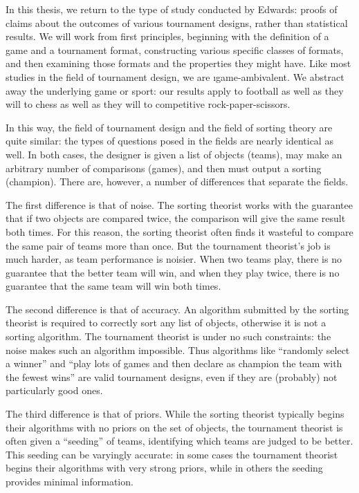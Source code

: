 {    In this thesis, we return to the type of study conducted by Edwards: proofs of claims about the outcomes of various tournament designs, rather than statistical results. We will work from first principles, beginning with the definition of a game and a tournament format, constructing various specific classes of formats, and then examining those formats and the properties they might have. Like most studies in the field of tournament design, we are \i{game-ambivalent}. We abstract away the underlying game or sport: our results apply to football as well as they will to chess as well as they will to competitive rock-paper-scissors.

    In this way, the field of tournament design and the field of sorting theory are quite similar: the types of questions posed in the fields are nearly identical as well. In both cases, the designer is given a list of objects (teams), may make an arbitrary number of comparisons (games), and then must output a sorting (champion). There are, however, a number of differences that separate the fields.

    The first difference is that of noise. The sorting theorist works with the guarantee that if two objects are compared twice, the comparison will give the same result both times. For this reason, the sorting theorist often finds it wasteful to compare the same pair of teams more than once. But the tournament theorist's job is much harder, as team performance is noisier. When two teams play, there is no guarantee that the better team will win, and when they play twice, there is no guarantee that the same team will win both times.

    The second difference is that of accuracy. An algorithm submitted by the sorting theorist is required to correctly sort any list of objects, otherwise it is not a sorting algorithm. The tournament theorist is under no such constraints: the noise makes such an algorithm impossible. Thus algorithms like ``randomly select a winner'' and ``play lots of games and then declare as champion the team with the fewest wins'' are valid tournament designs, even if they are (probably) not particularly good ones.

    The third difference is that of priors. While the sorting theorist typically begins their algorithms with no priors on the set of objects, the tournament theorist is often given a ``seeding'' of teams, identifying which teams are judged to be better. This seeding can be varyingly accurate: in some cases the tournament theorist begins their algorithms with very strong priors, while in others the seeding provides minimal information.

}
